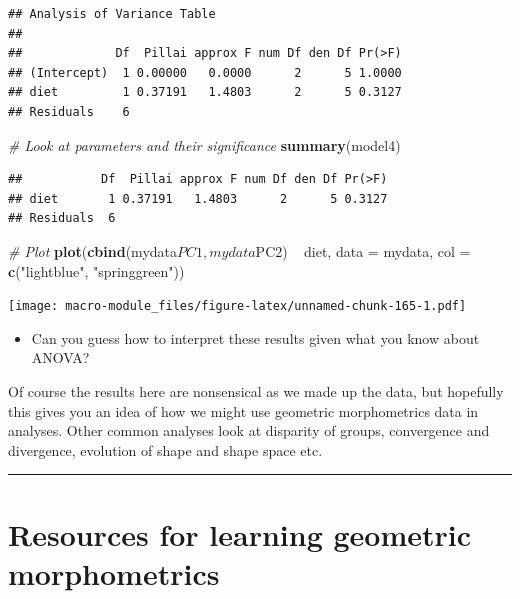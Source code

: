 \documentclass[]{book}
\newenvironment{Shaded}{\begin{snugshade}}{\end{snugshade}}
\newcommand{\KeywordTok}[1]{\textcolor[rgb]{0.13,0.29,0.53}{\textbf{{#1}}}}
\newcommand{\DataTypeTok}[1]{\textcolor[rgb]{0.13,0.29,0.53}{{#1}}}
\newcommand{\StringTok}[1]{\textcolor[rgb]{0.31,0.60,0.02}{{#1}}}
\newcommand{\CommentTok}[1]{\textcolor[rgb]{0.56,0.35,0.01}{\textit{{#1}}}}
\newcommand{\NormalTok}[1]{{#1}}
\providecommand{\tightlist}{%
  \setlength{\itemsep}{0pt}\setlength{\parskip}{0pt}}
\theoremstyle{definition}
\theoremstyle{definition}
\theoremstyle{definition}
\theoremstyle{remark}
\begin{document}
\begin{verbatim}
## Analysis of Variance Table
## 
##             Df  Pillai approx F num Df den Df Pr(>F)
## (Intercept)  1 0.00000   0.0000      2      5 1.0000
## diet         1 0.37191   1.4803      2      5 0.3127
## Residuals    6
\end{verbatim}

\begin{Shaded}
\begin{Highlighting}[]
\CommentTok{# Look at parameters and their significance}
\KeywordTok{summary}\NormalTok{(model4)}
\end{Highlighting}
\end{Shaded}

\begin{verbatim}
##           Df  Pillai approx F num Df den Df Pr(>F)
## diet       1 0.37191   1.4803      2      5 0.3127
## Residuals  6
\end{verbatim}

\begin{Shaded}
\begin{Highlighting}[]
\CommentTok{# Plot }
\KeywordTok{plot}\NormalTok{(}\KeywordTok{cbind}\NormalTok{(mydata$PC1,mydata$PC2) ~}\StringTok{ }\NormalTok{diet, }\DataTypeTok{data =} \NormalTok{mydata, }\DataTypeTok{col =} \KeywordTok{c}\NormalTok{(}\StringTok{"lightblue"}\NormalTok{, }\StringTok{"springgreen"}\NormalTok{))}
\end{Highlighting}
\end{Shaded}

\texttt{[image: macro-module\_files/figure-latex/unnamed-chunk-165-1.pdf]}

\begin{itemize}
\tightlist
\item
  Can you guess how to interpret these results given what you know about
  ANOVA?
\end{itemize}

Of course the results here are nonsensical as we made up the data, but
hopefully this gives you an idea of how we might use geometric
morphometrics data in analyses. Other common analyses look at disparity
of groups, convergence and divergence, evolution of shape and shape
space etc.

\begin{center}\rule{0.5\linewidth}{\linethickness}\end{center}

\section{Resources for learning geometric
morphometrics}\label{resources-for-learning-geometric-morphometrics}
\end{document}
